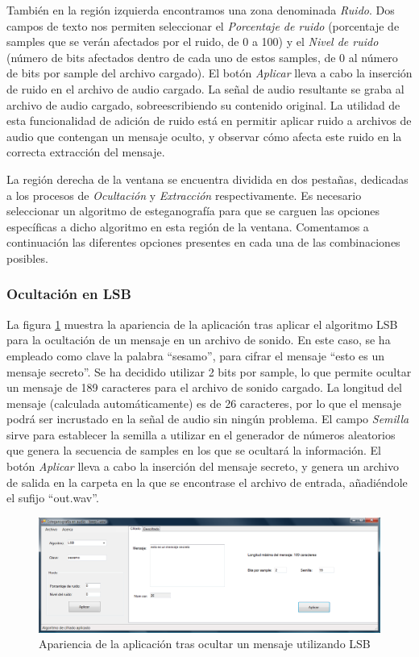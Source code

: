 \documentclass[12pt]{article}
\begin{document}
También en la región izquierda encontramos una zona denominada \emph{Ruido}. Dos campos de texto nos permiten seleccionar el \emph{Porcentaje de ruido} (porcentaje de samples que se verán afectados por el ruido, de 0 a 100) y el \emph{Nivel de ruido} (número de bits afectados dentro de cada uno de estos samples, de 0 al número de bits por sample del archivo cargado). El botón \emph{Aplicar} lleva a cabo la inserción de ruido en el archivo de audio cargado. La señal de audio resultante se graba al archivo de audio cargado, sobreescribiendo su contenido original. La utilidad de esta funcionalidad de adición de ruido está en permitir aplicar ruido a archivos de audio que contengan un mensaje oculto, y observar cómo afecta este ruido en la correcta extracción del mensaje.

La región derecha de la ventana se encuentra dividida en dos pestañas, dedicadas a los procesos de \emph{Ocultación} y \emph{Extracción} respectivamente. Es necesario seleccionar un algoritmo de esteganografía para que se carguen las opciones específicas a dicho algoritmo en esta región de la ventana. Comentamos a continuación las diferentes opciones presentes en cada una de las combinaciones posibles.

\subsubsection{Ocultación en LSB}

La figura \ref{ss2} muestra la apariencia de la aplicación tras aplicar el algoritmo LSB para la ocultación de un mensaje en un archivo de sonido. En este caso, se ha empleado como clave la palabra ``sesamo'', para cifrar el mensaje  ``esto es un mensaje secreto''. Se ha decidido utilizar 2 bits por sample, lo que permite ocultar un mensaje de 189 caracteres para el archivo de sonido cargado. La longitud del mensaje (calculada automáticamente) es de 26 caracteres, por lo que el mensaje podrá ser incrustado en la señal de audio sin ningún problema. El campo \emph{Semilla} sirve para establecer la semilla a utilizar en el generador de números aleatorios que genera la secuencia de samples en los que se ocultará la información. El botón \emph{Aplicar} lleva a cabo la inserción del mensaje secreto, y genera un archivo de salida en la carpeta en la que se encontrase el archivo de entrada, añadiéndole el sufijo ``out.wav''.

\begin{figure}[h]
  \centering
    \includegraphics[width=\textwidth]{img/ss2}
  \caption{Apariencia de la aplicación tras ocultar un mensaje utilizando LSB}
  \label{ss2}
\end{figure}
\end{document}

